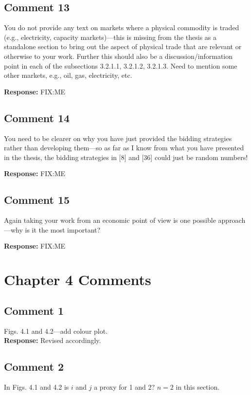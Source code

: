 \documentclass[10pt,a4paper,notitlepage]{article}
\numberwithin{equation}{section}
\begin{document}
\subsection{Comment 13}
You do not provide any text on markets where a physical commodity is traded (e.g., electricity, capacity markets)---this is missing from the thesis as a standalone section to bring out the aspect of physical trade that are relevant or otherwise to your work. Further this should also be a discussion/information point in each of the subsections 3.2.1.1, 3.2.1.2, 3.2.1.3. Need to mention some other markets, e.g., oil, gas, electricity, etc.

\textbf{Response:}
FIX:ME

\subsection{Comment 14}
You need to be clearer on why you have just provided the bidding strategies rather than developing them---so as far as I know from what you have presented in the thesis, the bidding strategies in [8] and [36] could just be random numbers!

\textbf{Response:}
FIX:ME

\subsection{Comment 15}
Again taking your work from an economic point of view is one possible approach---why is it the most important?

\textbf{Response:}
FIX:ME

\clearpage

\section{Chapter 4 Comments}
\subsection{Comment 1}
Figs. 4.1 and 4.2---add colour plot.\\[-2ex]

\textbf{Response:}
Revised accordingly.

\subsection{Comment 2}
In Figs. 4.1 and 4.2 is $i$ and $j$ a proxy for 1 and 2? $n=2$ in this section.\\[-2ex]
\end{document}
